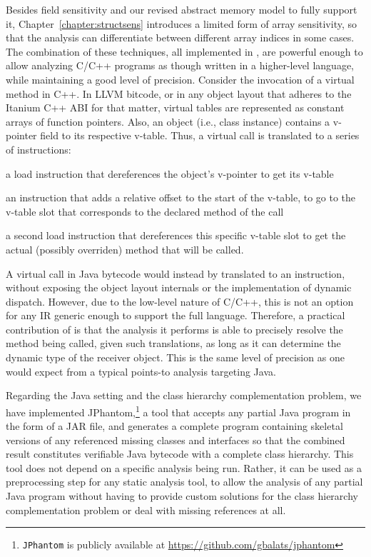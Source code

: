 Besides field sensitivity and our revised abstract memory model to
fully support it, Chapter~\ref{chapter:structsens} introduces a
limited form of array sensitivity, so that the analysis can
differentiate between different array indices in some cases. The
combination of these techniques, all implemented in \cclyzer{}, are
powerful enough to allow analyzing C/C++ programs as though written in
a higher-level language, while maintaining a good level of
precision. Consider the invocation of a virtual method in C++. In LLVM
bitcode, or in any object layout that adheres to the Itanium C++ ABI
\cite{itanium:cxx_abi} for that matter, virtual tables are represented
as constant arrays of function pointers. Also, an object (i.e., class
instance) contains a v-pointer field to its respective v-table. Thus,
a virtual call is translated to a series of instructions:
\begin{compactitem}[\(\cdot\)]
\item a load instruction that dereferences the object's v-pointer to
  get its v-table
\item an instruction that adds a relative offset to the start of the
  v-table, to go to the v-table slot that corresponds to the declared
  method of the call
\item a second load instruction that dereferences this specific
  v-table slot to get the actual (possibly overriden) method that will
  be called.
\end{compactitem}

A virtual call in Java bytecode would instead by translated to an
 instruction, without exposing the object layout
internals or the implementation of dynamic dispatch. However, due to
the low-level nature of C/C++, this is not an option for any IR
generic enough to support the full language. Therefore, a practical
contribution of \cclyzer{} is that the analysis it performs is able to
precisely resolve the method being called, given such translations, as
long as it can determine the dynamic type of the receiver object. This
is the same level of precision as one would expect from a typical
points-to analysis targeting Java.

Regarding the Java setting and the class hierarchy complementation
problem, we have implemented JPhantom,\footnote{\texttt{JPhantom} is
  publicly available at \url{https://github.com/gbalats/jphantom}} a
tool that accepts any partial Java program in the form of a JAR file,
and generates a complete program containing skeletal versions of any
referenced missing classes and interfaces so that the combined result
constitutes verifiable Java bytecode with a complete class
hierarchy. This tool does not depend on a specific analysis being
run. Rather, it can be used as a preprocessing step for any static
analysis tool, to allow the analysis of any partial Java program
without having to provide custom solutions for the class hierarchy
complementation problem or deal with missing references at all.


